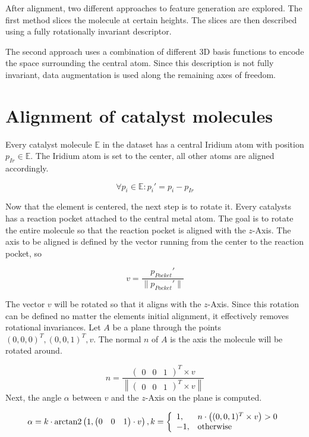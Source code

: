 After alignment, two different approaches to feature generation are explored.
The first method slices the molecule at certain heights.
The slices are then described using a fully rotationally invariant descriptor.

The second approach uses a combination of different 3D basis functions to encode the space surrounding the central atom.
Since this description is not fully invariant, data augmentation is used along the remaining axes of freedom.

\section{Alignment of catalyst molecules}

Every catalyst molecule $\mathbb{E}$ in the dataset has a central Iridium atom with position $p_{Ir} \in \mathbb{E}$.
The Iridium atom is set to the center, all other atoms are aligned accordingly.

$$ \forall p_i \in \mathbb{E}: p_i' = p_i - p_{Ir}$$

Now that the element is centered, the next step is to rotate it.
Every catalysts has a reaction pocket attached to the central metal atom.
The goal is to rotate the entire molecule so that the reaction pocket is aligned with the $z$-Axis.
The axis to be aligned is defined by the vector running from the center to the reaction pocket, so

$$ v = \frac{p_{Pocket}'}{\| p_{Pocket}'\| } $$

The vector $v$ will be rotated so that it aligns with the $z$-Axis.
Since this rotation can be defined no matter the elements initial alignment, it effectively removes rotational invariances.
Let $A$ be a plane through the points $(0,0,0)^T, (0,0,1)^T, v$.
The normal $n$ of $A$ is the axis the molecule will be rotated around.

$$
n =\frac{\begin{pmatrix}
  0 &
  0 &
  1
\end{pmatrix}^T \times v}{ \left\| \begin{pmatrix}
  0 &
  0 &
  1
\end{pmatrix}^T \times v \right\| }
$$
Next, the angle $\alpha$ between $v$ and the $z$-Axis on the plane is computed.

$$ 
\alpha = k \cdot \operatorname{arctan2} \left( 1,  
\begin{pmatrix} 0 &  0 & 1 \end{pmatrix} \cdot v \right),\space k = \left\{\begin{array}{ll} 1, & n \cdot \left( (0,0,1)^T \times v \right) > 0 \\
  -1, & \text{otherwise}\end{array}\right.
$$

